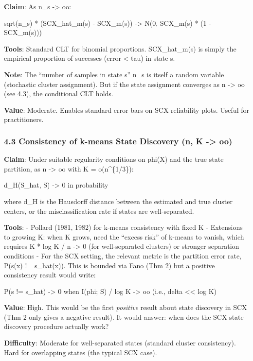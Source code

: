 \documentclass[
  12pt,
]{article}
\begin{document}
\textbf{Claim}: As n\_s -\textgreater{} oo:

sqrt(n\_s) * (SCX\_hat\_m(s) - SCX\_m(s)) -\textgreater{} N(0, SCX\_m(s)
* (1 - SCX\_m(s)))

\textbf{Tools}: Standard CLT for binomial proportions. SCX\_hat\_m(s) is
simply the empirical proportion of successes (error \textless{} tau) in
state s.

\textbf{Note}: The ``number of samples in state s'' n\_s is itself a
random variable (stochastic cluster assignment). But if the state
assignment converges as n -\textgreater{} oo (see 4.3), the conditional
CLT holds.

\textbf{Value}: Moderate. Enables standard error bars on SCX reliability
plots. Useful for practitioners.

\subsubsection{4.3 Consistency of k-means State Discovery (n, K
-\textgreater{}
oo)}\label{consistency-of-k-means-state-discovery-n-k---oo}

\textbf{Claim}: Under suitable regularity conditions on phi(X) and the
true state partition, as n -\textgreater{} oo with K = o(n\^{}\{1/3\}):

d\_H(S\_hat, S) -\textgreater{} 0 in probability

where d\_H is the Hausdorff distance between the estimated and true
cluster centers, or the misclassification rate if states are
well-separated.

\textbf{Tools}: - Pollard (1981, 1982) for k-means consistency with
fixed K - Extensions to growing K: when K grows, need the ``excess
risk'' of k-means to vanish, which requires K * log K / n
-\textgreater{} 0 (for well-separated clusters) or stronger separation
conditions - For the SCX setting, the relevant metric is the partition
error rate, P(s(x) != s\_hat(x)). This is bounded via Fano (Thm 2) but a
positive consistency result would write:

P(s != s\_hat) -\textgreater{} 0 when I(phi; S) / log K -\textgreater{}
oo (i.e., delta \textless\textless{} log K)

\textbf{Value}: High. This would be the first \emph{positive} result
about state discovery in SCX (Thm 2 only gives a negative result). It
would answer: when does the SCX state discovery procedure actually work?

\textbf{Difficulty}: Moderate for well-separated states (standard
cluster consistency). Hard for overlapping states (the typical SCX
case).
\end{document}
